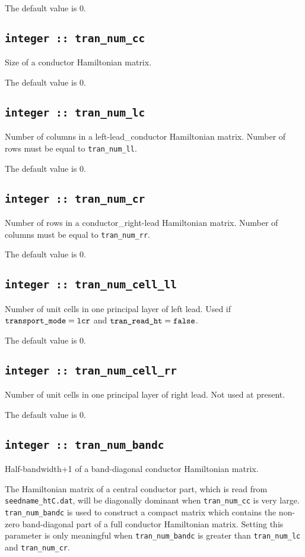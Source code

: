 The default value is 0.

\subsection[tran\_num\_cc]{\tt integer :: tran\_num\_cc}
Size of a conductor Hamiltonian matrix.

The default value is 0.

\subsection[tran\_num\_lc]{\tt integer :: tran\_num\_lc}
Number of columns in a left-lead\_conductor Hamiltonian matrix.
Number of rows must be equal to \verb#tran_num_ll#.


The default value is 0.

\subsection[tran\_num\_cr]{\tt integer :: tran\_num\_cr}
Number of rows in a conductor\_right-lead Hamiltonian matrix.
Number of columns must be equal to \verb#tran_num_rr#.

The default value is 0.

\subsection[tran\_num\_cell\_ll]{\tt integer :: tran\_num\_cell\_ll}
Number of unit cells in one principal layer of left lead.
Used if $\verb#transport_mode# = \verb#lcr#$ and
$\verb#tran_read_ht# = \verb#false#$.

The default value is 0.

\subsection[tran\_num\_cell\_rr]{\tt integer :: tran\_num\_cell\_rr}
Number of unit cells in one principal layer of right lead.
Not used at present.

The default value is 0.

\subsection[tran\_num\_bandc]{\tt integer :: tran\_num\_bandc}

Half-bandwidth+1 of a band-diagonal conductor Hamiltonian matrix.

The Hamiltonian matrix of a central conductor part, which is
read from \verb#seedname_htC.dat#, will be diagonally dominant
when \verb#tran_num_cc# is very large.
\verb#tran_num_bandc# is used to construct
a compact matrix which contains
the non-zero band-diagonal part of a full conductor Hamiltonian matrix.
Setting this parameter is only meaningful when
\verb#tran_num_bandc# is greater than
\verb#tran_num_lc# and \verb#tran_num_cr#.

